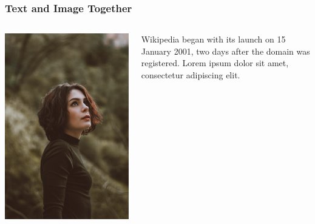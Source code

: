 \begin{frame}
	\frametitle{Text and Image Together}
	\begin{columns}
		\begin{column}{0.30\textwidth}
			\includegraphics[width=\textwidth]{assets/image2.jpg}
		\end{column}
		\begin{column}{0.65\textwidth}
			Wikipedia began with its launch on 15 January 2001, two days after the domain was registered. Lorem ipsum dolor sit amet, consectetur adipiscing elit.
		\end{column}
	\end{columns}
\end{frame}
